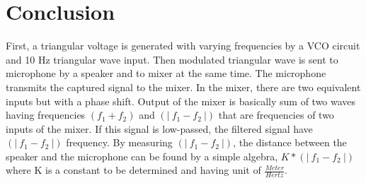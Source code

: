 \documentclass[paper]{IEEEtran}
\begin{document}
\vfill

\section{Conclusion}
\- \indent
	First, a triangular voltage is generated with varying frequencies by a VCO circuit and 10 Hz triangular wave input. Then modulated triangular wave is sent to microphone by a speaker and to mixer at the same time. The microphone transmits the captured signal to the mixer. In the mixer, there are two equivalent inputs but with a phase shift. Output of the mixer is basically sum of two waves having frequencies $ (f_1+f_2)$ and $(|~f_1 -f_2~|) $ that are frequencies of two inputs of the mixer. If this signal is low-passed, the filtered signal have $(|~f_1 -f_2~|) $ frequency. By measuring $(|~f_1 -f_2~|) $, the distance between the speaker and the microphone can be found by a simple algebra, $K*(|~f_1 -f_2~|) $ where K is a constant to be determined and having unit of $\frac{Meter}{Hertz} $.

 


\end{document}
